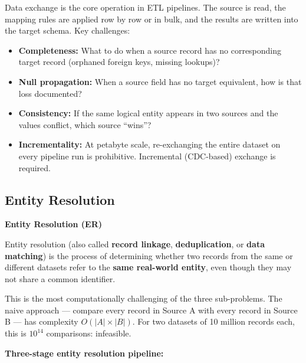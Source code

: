 \documentclass[12pt,a4paper]{article}
\newcommand{\defbox}[2]{%
  \noindent
  \colorbox{PUNavy!12}{%
    \begin{minipage}{\dimexpr\linewidth-2\fboxsep}
      \vspace{4pt}\textbf{\textcolor{PUNavy}{#1}}\par\vspace{2pt}
      #2\vspace{4pt}
    \end{minipage}%
  }\par\vspace{6pt}%
}
\begin{document}
Data exchange is the core operation in ETL pipelines.  The source is read, the mapping rules are applied row by row or in bulk, and the results are written into the target schema.  Key challenges:
\begin{itemize}[leftmargin=1.8em]
  \item \textbf{Completeness:} What to do when a source record has no corresponding target record (orphaned foreign keys, missing lookups)?
  \item \textbf{Null propagation:} When a source field has no target equivalent, how is that loss documented?
  \item \textbf{Consistency:} If the same logical entity appears in two sources and the values conflict, which source ``wins''?
  \item \textbf{Incrementality:} At petabyte scale, re-exchanging the entire dataset on every pipeline run is prohibitive.  Incremental (CDC-based) exchange is required.
\end{itemize}

\subsection{Entity Resolution}

\defbox{Entity Resolution (ER)}{Entity resolution (also called \textbf{record linkage}, \textbf{deduplication}, or \textbf{data matching}) is the process of determining whether two records from the same or different datasets refer to the \textbf{same real-world entity}, even though they may not share a common identifier.}

This is the most computationally challenging of the three sub-problems.  The naive approach --- compare every record in Source A with every record in Source B --- has complexity $O(|A| \times |B|)$.  For two datasets of 10 million records each, this is $10^{14}$ comparisons: infeasible.

\textbf{Three-stage entity resolution pipeline:}
\end{document}
